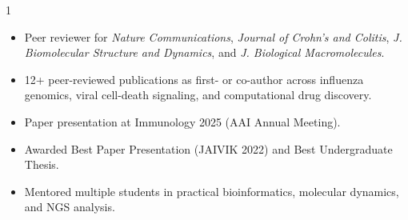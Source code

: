 \documentclass[11pt,letterpaper,withhyper]{altacv}
\begin{document}
\begin{paracol}{1}

\printbibliography[heading=pubtype,title={\printinfo{\faUsers}{Conference Proceedings}},type=inproceedings]

\switchcolumn

\begin{itemize}[leftmargin=*]
	\item Peer reviewer for \textit{Nature Communications}, \textit{Journal of Crohn's and Colitis}, \textit{J. Biomolecular Structure and Dynamics}, and \textit{J. Biological Macromolecules}.
	\item 12+ peer-reviewed publications as first- or co-author across influenza genomics, viral cell-death signaling, and computational drug discovery.
	\item Paper presentation at Immunology 2025 (AAI Annual Meeting).
	\item Awarded Best Paper Presentation (JAIVIK 2022) and Best Undergraduate Thesis.
	\item Mentored multiple students in practical bioinformatics, molecular dynamics, and NGS analysis.
\end{itemize}


\end{paracol}
\end{document}
